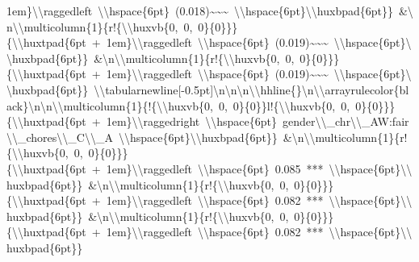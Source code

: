 \documentclass[
  english,
  man]{apa6}
\begin{document}
1em\}\textbackslash{}\textbackslash{}raggedleft\ \textbackslash{}\textbackslash{}hspace\{6pt\}\ (0.018)\textasciitilde{}\textasciitilde{}\textasciitilde{}\ \textbackslash{}\textbackslash{}hspace\{6pt\}\textbackslash{}\textbackslash{}huxbpad\{6pt\}\}\ \&\textbackslash{}n\textbackslash{}\textbackslash{}multicolumn\{1\}\{r!\{\textbackslash{}\textbackslash{}huxvb\{0,\ 0,\ 0\}\{0\}\}\}\{\textbackslash{}\textbackslash{}huxtpad\{6pt\ +\ 1em\}\textbackslash{}\textbackslash{}raggedleft\ \textbackslash{}\textbackslash{}hspace\{6pt\}\ (0.019)\textasciitilde{}\textasciitilde{}\textasciitilde{}\ \textbackslash{}\textbackslash{}hspace\{6pt\}\textbackslash{}\textbackslash{}huxbpad\{6pt\}\}\ \&\textbackslash{}n\textbackslash{}\textbackslash{}multicolumn\{1\}\{r!\{\textbackslash{}\textbackslash{}huxvb\{0,\ 0,\ 0\}\{0\}\}\}\{\textbackslash{}\textbackslash{}huxtpad\{6pt\ +\ 1em\}\textbackslash{}\textbackslash{}raggedleft\ \textbackslash{}\textbackslash{}hspace\{6pt\}\ (0.019)\textasciitilde{}\textasciitilde{}\textasciitilde{}\ \textbackslash{}\textbackslash{}hspace\{6pt\}\textbackslash{}\textbackslash{}huxbpad\{6pt\}\}\ \textbackslash{}\textbackslash{}tabularnewline{[}-0.5pt{]}\textbackslash{}n\textbackslash{}n\textbackslash{}n\textbackslash{}\textbackslash{}hhline\{\}\textbackslash{}n\textbackslash{}\textbackslash{}arrayrulecolor\{black\}\textbackslash{}n\textbackslash{}n\textbackslash{}\textbackslash{}multicolumn\{1\}\{!\{\textbackslash{}\textbackslash{}huxvb\{0,\ 0,\ 0\}\{0\}\}l!\{\textbackslash{}\textbackslash{}huxvb\{0,\ 0,\ 0\}\{0\}\}\}\{\textbackslash{}\textbackslash{}huxtpad\{6pt\ +\ 1em\}\textbackslash{}\textbackslash{}raggedright\ \textbackslash{}\textbackslash{}hspace\{6pt\}\ gender\textbackslash{}\textbackslash{}\_chr\textbackslash{}\textbackslash{}\_AW:fair\textbackslash{}\textbackslash{}\_chores\textbackslash{}\textbackslash{}\_C\textbackslash{}\textbackslash{}\_A\ \textbackslash{}\textbackslash{}hspace\{6pt\}\textbackslash{}\textbackslash{}huxbpad\{6pt\}\}\ \&\textbackslash{}n\textbackslash{}\textbackslash{}multicolumn\{1\}\{r!\{\textbackslash{}\textbackslash{}huxvb\{0,\ 0,\ 0\}\{0\}\}\}\{\textbackslash{}\textbackslash{}huxtpad\{6pt\ +\ 1em\}\textbackslash{}\textbackslash{}raggedleft\ \textbackslash{}\textbackslash{}hspace\{6pt\}\ 0.085\ ***\ \textbackslash{}\textbackslash{}hspace\{6pt\}\textbackslash{}\textbackslash{}huxbpad\{6pt\}\}\ \&\textbackslash{}n\textbackslash{}\textbackslash{}multicolumn\{1\}\{r!\{\textbackslash{}\textbackslash{}huxvb\{0,\ 0,\ 0\}\{0\}\}\}\{\textbackslash{}\textbackslash{}huxtpad\{6pt\ +\ 1em\}\textbackslash{}\textbackslash{}raggedleft\ \textbackslash{}\textbackslash{}hspace\{6pt\}\ 0.082\ ***\ \textbackslash{}\textbackslash{}hspace\{6pt\}\textbackslash{}\textbackslash{}huxbpad\{6pt\}\}\ \&\textbackslash{}n\textbackslash{}\textbackslash{}multicolumn\{1\}\{r!\{\textbackslash{}\textbackslash{}huxvb\{0,\ 0,\ 0\}\{0\}\}\}\{\textbackslash{}\textbackslash{}huxtpad\{6pt\ +\ 1em\}\textbackslash{}\textbackslash{}raggedleft\ \textbackslash{}\textbackslash{}hspace\{6pt\}\ 0.082\ ***\ \textbackslash{}\textbackslash{}hspace\{6pt\}\textbackslash{}\textbackslash{}huxbpad\{6pt\}\}\ 
\end{document}
